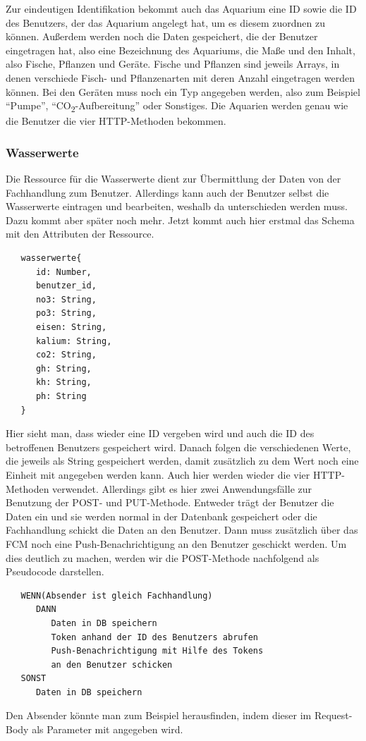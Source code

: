 Zur eindeutigen Identifikation bekommt auch das Aquarium eine ID sowie die ID des Benutzers, der das Aquarium angelegt hat, um es diesem zuordnen zu können. Außerdem werden noch die Daten gespeichert, die der Benutzer eingetragen hat, also eine Bezeichnung des Aquariums, die Maße und den Inhalt, also Fische, Pflanzen und Geräte. Fische und Pflanzen sind jeweils Arrays, in denen verschiede Fisch- und Pflanzenarten mit deren Anzahl eingetragen werden können. Bei den Geräten muss noch ein Typ angegeben werden, also zum Beispiel ``Pumpe'', ``CO\textsubscript{2}-Aufbereitung'' oder Sonstiges. Die Aquarien werden genau wie die Benutzer die vier HTTP-Methoden bekommen. 

\subsubsection{Wasserwerte}

Die Ressource für die Wasserwerte dient zur Übermittlung der Daten von der Fachhandlung zum Benutzer. Allerdings kann auch der Benutzer selbst die Wasserwerte eintragen und bearbeiten, weshalb da unterschieden werden muss. Dazu kommt aber später noch mehr. Jetzt kommt auch hier erstmal das Schema mit den Attributen der Ressource.

\begin{lstlisting}
   wasserwerte{
      id: Number,
      benutzer_id,
      no3: String,
      po3: String,
      eisen: String,
      kalium: String,
      co2: String,
      gh: String,
      kh: String,
      ph: String
   }
\end{lstlisting}

Hier sieht man, dass wieder eine ID vergeben wird und auch die ID des betroffenen Benutzers gespeichert wird. Danach folgen die verschiedenen Werte, die jeweils als String gespeichert werden, damit zusätzlich zu dem Wert noch eine Einheit mit angegeben werden kann. Auch hier werden wieder die vier HTTP-Methoden verwendet. Allerdings gibt es hier zwei Anwendungsfälle zur Benutzung der POST- und PUT-Methode. Entweder trägt der Benutzer die Daten ein und sie werden normal in der Datenbank gespeichert oder die Fachhandlung schickt die Daten an den Benutzer. Dann muss zusätzlich über das FCM noch eine Push-Benachrichtigung an den Benutzer geschickt werden. Um dies deutlich zu machen, werden wir die POST-Methode nachfolgend als Pseudocode darstellen.

\begin{lstlisting}
   WENN(Absender ist gleich Fachhandlung)
      DANN
         Daten in DB speichern
         Token anhand der ID des Benutzers abrufen
         Push-Benachrichtigung mit Hilfe des Tokens 
         an den Benutzer schicken
   SONST
      Daten in DB speichern
\end{lstlisting}

Den Absender könnte man zum Beispiel herausfinden, indem dieser im Request-Body als Parameter mit angegeben wird.